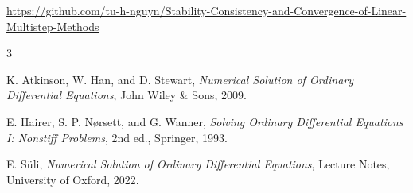 \documentclass[12pt,a4paper]{article}
\begin{document}
\begin{center}
\url{https://github.com/tu-h-nguyn/Stability-Consistency-and-Convergence-of-Linear-Multistep-Methods}
\end{center}

\newpage


\newpage

\newpage

\newpage

\renewcommand{\refname}{Tài liệu tham khảo}
\begin{thebibliography}{3}

K. Atkinson, W. Han, and D. Stewart,
\textit{Numerical Solution of Ordinary Differential Equations},
John Wiley \& Sons, 2009.

E. Hairer, S. P. N{\o}rsett, and G. Wanner,
\textit{Solving Ordinary Differential Equations I: Nonstiff Problems},
2nd ed., Springer, 1993.

E. S\"uli,
\textit{Numerical Solution of Ordinary Differential Equations},
Lecture Notes, University of Oxford, 2022.

\end{thebibliography}
\end{document}
